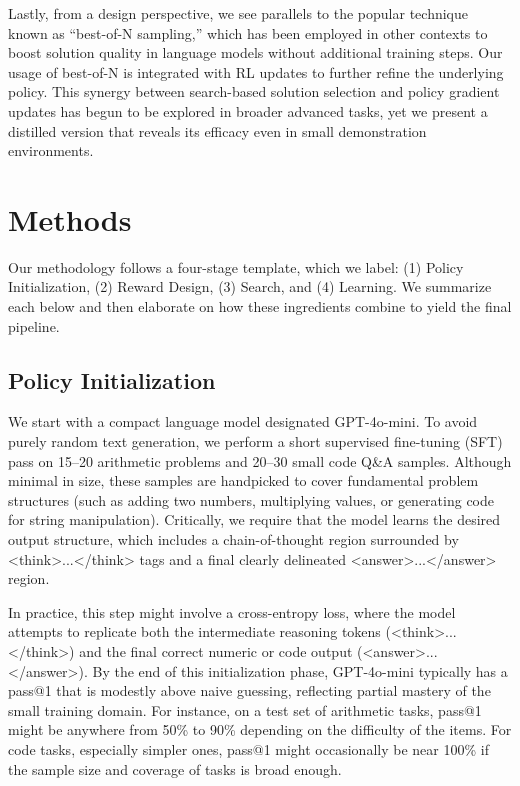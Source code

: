 \documentclass{article}
\begin{document}
Lastly, from a design perspective, we see parallels to the popular technique known as “best-of-N sampling,” which has been employed in other contexts to boost solution quality in language models without additional training steps. Our usage of best-of-N is integrated with RL updates to further refine the underlying policy. This synergy between search-based solution selection and policy gradient updates has begun to be explored in broader advanced tasks, yet we present a distilled version that reveals its efficacy even in small demonstration environments.

\section{Methods}
Our methodology follows a four-stage template, which we label: (1) Policy Initialization, (2) Reward Design, (3) Search, and (4) Learning. We summarize each below and then elaborate on how these ingredients combine to yield the final pipeline.

\subsection{Policy Initialization}
We start with a compact language model designated GPT-4o-mini. To avoid purely random text generation, we perform a short supervised fine-tuning (SFT) pass on 15–20 arithmetic problems and 20–30 small code Q\&A samples. Although minimal in size, these samples are handpicked to cover fundamental problem structures (such as adding two numbers, multiplying values, or generating code for string manipulation). Critically, we require that the model learns the desired output structure, which includes a chain-of-thought region surrounded by <think>...</think> tags and a final clearly delineated <answer>...</answer> region. 

In practice, this step might involve a cross-entropy loss, where the model attempts to replicate both the intermediate reasoning tokens (<think>...</think>) and the final correct numeric or code output (<answer>...</answer>). By the end of this initialization phase, GPT-4o-mini typically has a pass@1 that is modestly above naive guessing, reflecting partial mastery of the small training domain. For instance, on a test set of arithmetic tasks, pass@1 might be anywhere from 50\% to 90\% depending on the difficulty of the items. For code tasks, especially simpler ones, pass@1 might occasionally be near 100\% if the sample size and coverage of tasks is broad enough.
\end{document}
